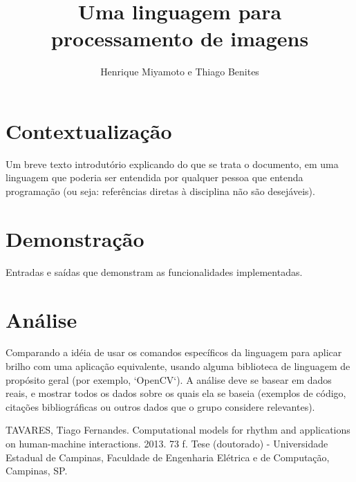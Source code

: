 \documentclass[a4paper, 10pt, conference]{ieeeconf}
\title{\LARGE \bf Uma linguagem para processamento de imagens}
\author{Henrique Miyamoto e Thiago Benites}
\begin{document}
\maketitle
\thispagestyle{empty}
\pagestyle{empty}




\section{Contextualização}

Um breve texto introdutório explicando do que se trata o documento, em uma linguagem que poderia ser entendida por qualquer pessoa que entenda programação (ou seja: referências diretas à disciplina não são desejáveis).

\section{Demonstração}

Entradas e saídas que demonstram as funcionalidades implementadas.

\section{Análise}

Comparando a idéia de usar os comandos específicos da linguagem para aplicar brilho com uma aplicação equivalente, usando alguma biblioteca de linguagem de propósito geral (por exemplo, `OpenCV`). A análise deve se basear em dados reais, e mostrar todos os dados sobre os quais ela se baseia (exemplos de código, citações bibliográficas ou outros dados que o grupo considere relevantes).

\begin{thebibliography}{99}

 TAVARES, Tiago Fernandes. Computational models for rhythm and applications on human-machine interactions. 2013. 73 f. Tese (doutorado) - Universidade Estadual de Campinas, Faculdade de Engenharia Elétrica e de Computação, Campinas, SP.

\end{thebibliography}
\end{document}

